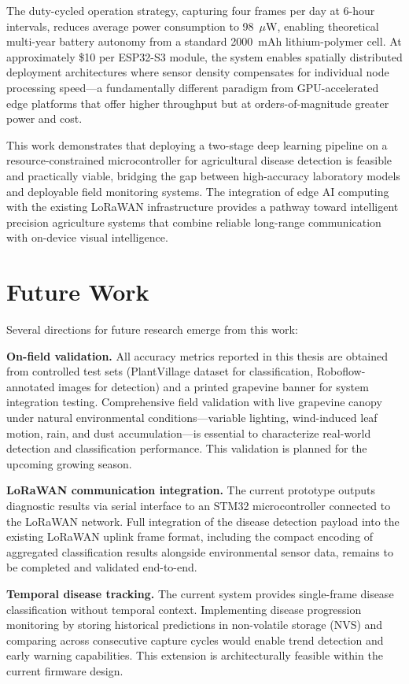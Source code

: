 The duty-cycled operation strategy, capturing four frames per day at 6-hour intervals, reduces average power consumption to 98~$\mu$W, enabling theoretical multi-year battery autonomy from a standard 2000~mAh lithium-polymer cell. At approximately \$10 per ESP32-S3 module, the system enables spatially distributed deployment architectures where sensor density compensates for individual node processing speed---a fundamentally different paradigm from GPU-accelerated edge platforms that offer higher throughput but at orders-of-magnitude greater power and cost.

This work demonstrates that deploying a two-stage deep learning pipeline on a resource-constrained microcontroller for agricultural disease detection is feasible and practically viable, bridging the gap between high-accuracy laboratory models and deployable field monitoring systems. The integration of edge AI computing with the existing LoRaWAN infrastructure provides a pathway toward intelligent precision agriculture systems that combine reliable long-range communication with on-device visual intelligence.


\section{Future Work}

Several directions for future research emerge from this work:

\textbf{On-field validation.} All accuracy metrics reported in this thesis are obtained from controlled test sets (PlantVillage dataset for classification, Roboflow-annotated images for detection) and a printed grapevine banner for system integration testing. Comprehensive field validation with live grapevine canopy under natural environmental conditions---variable lighting, wind-induced leaf motion, rain, and dust accumulation---is essential to characterize real-world detection and classification performance. This validation is planned for the upcoming growing season.

\textbf{LoRaWAN communication integration.} The current prototype outputs diagnostic results via serial interface to an STM32 microcontroller connected to the LoRaWAN network. Full integration of the disease detection payload into the existing LoRaWAN uplink frame format, including the compact encoding of aggregated classification results alongside environmental sensor data, remains to be completed and validated end-to-end.

\textbf{Temporal disease tracking.} The current system provides single-frame disease classification without temporal context. Implementing disease progression monitoring by storing historical predictions in non-volatile storage (NVS) and comparing across consecutive capture cycles would enable trend detection and early warning capabilities. This extension is architecturally feasible within the current firmware design.

